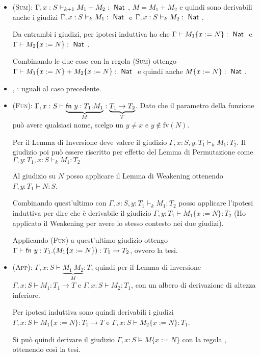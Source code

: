 \begin{itemize}
	\item \textsc{(Sum)}: $\Gamma, x : S \vdash_{k+1} M_1 + M_2 : \Nat$, $M = M_1 + M_2$ e quindi sono derivabili anche i giudizi $\Gamma, x : S \vdash_k M_1 :\Nat$ e $\Gamma, x : S \vdash_k M_2 :\Nat$. 
	
	Da entrambi i giudizi, per ipotesi induttiva ho che $\Gamma \vdash M_1\{x := N\} : \Nat$ e $\Gamma \vdash M_2\{x := N\} : \Nat$. 
	
	Combinando le due cose con la regola \textsc{(Sum)} ottengo $\Gamma \vdash M_1\{x := N\} + M_2\{x:=N\} : \Nat$ e quindi anche $M\{x:=N\}: \Nat$.
	
	\item {}, : uguali al caso precedente.
	
	\item \textsc{(Fun)}: $\Gamma, x: S \vdash \underbrace{\fn y : T_1 . M_1}_{M} : \underbrace{T_1 \rightarrow T_2}_{T}$. 
	Dato che il parametro della funzione può avere qualsiasi nome, scelgo un $y \neq x$ e $y \notin \text{fv}(N)$. 
	
	Per il Lemma di Inversione deve valere il giudizio $\Gamma, x: S, y:T_1 \vdash_k M_1:T_2$. Il giudizio poi può essere riscritto per effetto del Lemma di Permutazione come $\Gamma, y:T_1, x: S \vdash_k M_1:T_2$
	
	Al giudizio su $N$ posso applicare il Lemma di Weakening ottenendo $\Gamma, y : T_1 \vdash N : S$. 
	
	Combinando quest'ultimo con $\Gamma, x: S, y:T_1 \vdash_k M_1:T_2$ posso applicare l'ipotesi induttiva per dire che è derivabile il giudizio $\Gamma, y : T_1 \vdash M_1\{x:=N\} :T_2$ (Ho applicato il Weakening per avere lo stesso contesto nei due giudizi). 
	
	Applicando \textsc{(Fun)} a quest'ultimo giudizio ottengo $\Gamma \vdash \fn y : T_1 . (M_1\{x:=N\}):T_1\rightarrow T_2$, ovvero la tesi.

	
	\item \textsc{(App)}: $ \Gamma, x : S \vdash \underbrace{M_1 \ M_2}_{M} : T$, quindi per il Lemma di inversione $\Gamma, x : S \vdash M_1 : T_1 \to T$ e $\Gamma, x : S \vdash M_2 : T_1$, con un albero di derivazione di altezza inferiore.
	
	Per ipotesi induttiva sono quindi derivabili i giudizi $\Gamma, x : S \vdash M_1\{x := N \} : T_1 \to T$ e $\Gamma, x : S \vdash M_2\{x := N\} : T_1$.
	
	Si può quindi derivare il giudizio $\Gamma, x : S \vDash M \{x := N\}$ con la regola , ottenendo così la tesi.
\end{itemize}

